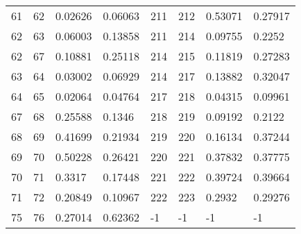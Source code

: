 \begin{tabular}{llllllll}
61&62&0.02626&0.06063&211&212&0.53071&0.27917\\
62&63&0.06003&0.13858&211&214&0.09755&0.2252\\
62&67&0.10881&0.25118&214&215&0.11819&0.27283\\
63&64&0.03002&0.06929&214&217&0.13882&0.32047\\
64&65&0.02064&0.04764&217&218&0.04315&0.09961\\
67&68&0.25588&0.1346&218&219&0.09192&0.2122\\
68&69&0.41699&0.21934&219&220&0.16134&0.37244\\
69&70&0.50228&0.26421&220&221&0.37832&0.37775\\
70&71&0.3317&0.17448&221&222&0.39724&0.39664\\
71&72&0.20849&0.10967&222&223&0.2932&0.29276\\
75&76&0.27014&0.62362&-1&-1&-1&-1\\
\bottomrule
\end{tabular}
